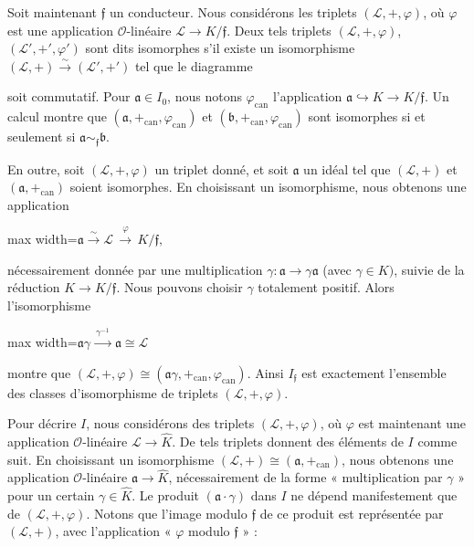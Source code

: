 \documentclass[11pt]{article}
\newcommand{\DFormula}[1]{\par\smallskip\noindent\begin{adjustbox}{max width=\linewidth}$\displaystyle #1$\end{adjustbox}\par\smallskip}
\begin{document}
\par
Soit maintenant \(𝔣\) un conducteur. Nous considérons les triplets \((\mathcal{L},+,\varphi )\), où \(\varphi \) est une application \(\mathcal{O}\)-linéaire \(\mathcal{L}\to K/𝔣\). Deux tels triplets \((\mathcal{L},+,\varphi )\), \((\mathcal{L}',+',\varphi ')\) sont dits isomorphes s’il existe un isomorphisme \((\mathcal{L},+)\xrightarrow{\sim}(\mathcal{L}',+')\) tel que le diagramme\par
\par
\begin{center}\end{center}
\par
soit commutatif. Pour \(𝔞\in I_{0}\), nous notons \(\varphi _{\mathrm{can}}\) l’application \(𝔞\hookrightarrow K\to K/𝔣\). Un calcul montre que \((𝔞,+_{\mathrm{can}},\varphi _{\mathrm{can}})\) et \((𝔟,+_{\mathrm{can}},\varphi _{\mathrm{can}})\) sont isomorphes si et seulement si \(𝔞\sim _{𝔣}𝔟\).\par
\par
En outre, soit \((\mathcal{L},+,\varphi )\) un triplet donné, et soit \(𝔞\) un idéal tel que \((\mathcal{L},+)\) et \((𝔞,+_{\mathrm{can}})\) soient isomorphes. En choisissant un isomorphisme, nous obtenons une application\par
\par
\DFormula{𝔞\xrightarrow{\sim}\mathcal{L}\,\xrightarrow{\varphi }\,K/𝔣,}
\par
nécessairement donnée par une multiplication \(\gamma :𝔞\to \gamma 𝔞\) (avec \(\gamma \in K)\), suivie de la réduction \(K\to K/𝔣\). Nous pouvons choisir \(\gamma \) totalement positif. Alors l’isomorphisme\par
\par
\DFormula{𝔞\gamma \,\xrightarrow{\gamma ^{-1}}\,𝔞\cong \mathcal{L}}
\par
montre que \((\mathcal{L},+,\varphi )\cong (𝔞\gamma ,+_{\mathrm{can}},\varphi _{\mathrm{can}})\). Ainsi \(I_{𝔣}\) est exactement l’ensemble des classes d’isomorphisme de triplets \((\mathcal{L},+,\varphi )\).\par
\par
Pour décrire \(I\), nous considérons des triplets \((\mathcal{L},+,\varphi )\), où \(\varphi \) est maintenant une application \(\mathcal{O}\)-linéaire \(\mathcal{L}\to \widehat{K}\). De tels triplets donnent des éléments de \(I\) comme suit. En choisissant un isomorphisme \((\mathcal{L},+)\cong (𝔞,+_{\mathrm{can}})\), nous obtenons une application \(\mathcal{O}\)-linéaire \(𝔞\to \widehat{K}\), nécessairement de la forme « multiplication par \(\gamma \) » pour un certain \(\gamma \in \widehat{K}\). Le produit \((𝔞\cdot \gamma )\) dans \(I\) ne dépend manifestement que de \((\mathcal{L},+,\varphi )\). Notons que l’image modulo \(𝔣\) de ce produit est représentée par \((\mathcal{L},+)\), avec l’application « \(\varphi \) modulo \(𝔣\) » :\par
\end{document}
